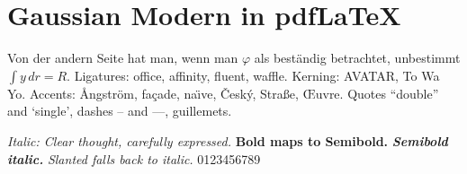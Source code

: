 \documentclass{article}
\begin{document}
\section{Gaussian Modern in pdf\LaTeX}
Von der andern Seite hat man, wenn man $\varphi$ als best\"andig betrachtet,
unbestimmt $\int y\,dr = R$. Ligatures: office, affinity, fluent, waffle.
Kerning: AVATAR, To Wa Yo. Accents: \AA ngstr\"om, fa\c{c}ade, na\"\i ve, \v{C}esk\'y, Stra\ss e, \OE uvre.
Quotes ``double'' and `single', dashes -- and ---, \guillemotleft guillemets\guillemotright.

\textit{Italic: Clear thought, carefully expressed.}
\textbf{Bold maps to Semibold.} \textbf{\textit{Semibold italic.}}
\textsl{Slanted falls back to italic.} 0123456789
\end{document}
